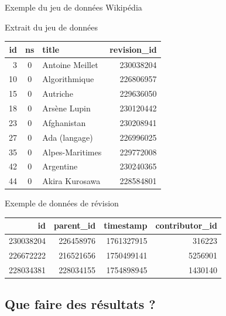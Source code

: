 \documentclass[a4paper,12pt]{beamer}
\begin{document}
\begin{frame}{Exemple du jeu de données Wikipédia}

\scriptsize

\begin{block}{Extrait du jeu de données}
\centering
\begin{tabular}{r c l r}
\textbf{id} & \textbf{ns} & \textbf{title} & \textbf{revision\_id} \\
\hline
3  & 0 & Antoine Meillet & 230038204 \\
10 & 0 & Algorithmique & 226806957 \\
15 & 0 & Autriche & 229636050 \\
18 & 0 & Arsène Lupin & 230120442 \\
23 & 0 & Afghanistan & 230208941 \\
27 & 0 & Ada (langage) & 226996025 \\
35 & 0 & Alpes-Maritimes & 229772008 \\
42 & 0 & Argentine & 230240365 \\
44 & 0 & Akira Kurosawa & 228584801 \\
\end{tabular}
\end{block}

\vspace{0.2cm}

\begin{block}{Exemple de données de révision}
\centering
\begin{tabular}{r r r r}
\textbf{id} & \textbf{parent\_id} &
\textbf{timestamp} & \textbf{contributor\_id} \\
\hline
230038204 & 226458976 & 1761327915 & 316223 \\
226672222 & 216521656 & 1750499141 & 5256901 \\
228034381 & 228034155 & 1754898945 & 1430140 \\
\end{tabular}
\end{block}

\end{frame}

\subsection{Que faire des résultats ?}
\end{document}
